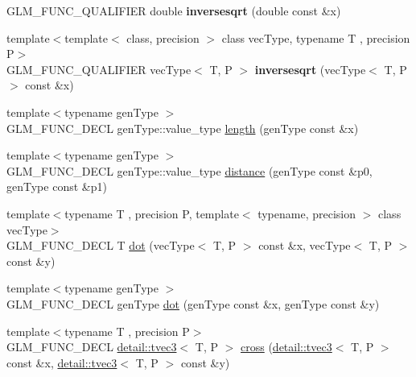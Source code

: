 \begin{DoxyCompactItemize}
\item 
G\+L\+M\+\_\+\+F\+U\+N\+C\+\_\+\+Q\+U\+A\+L\+I\+F\+I\+ER double {\bfseries inversesqrt} (double const \&x)\hypertarget{namespaceglm_a83786622d7ff4afca48a9c730b4cabf4}{}\label{namespaceglm_a83786622d7ff4afca48a9c730b4cabf4}

\item 
{\footnotesize template$<$template$<$ class, precision $>$ class vec\+Type, typename T , precision P$>$ }\\G\+L\+M\+\_\+\+F\+U\+N\+C\+\_\+\+Q\+U\+A\+L\+I\+F\+I\+ER vec\+Type$<$ T, P $>$ {\bfseries inversesqrt} (vec\+Type$<$ T, P $>$ const \&x)\hypertarget{namespaceglm_a3f7480375deccaf2afd47faa620d5fd8}{}\label{namespaceglm_a3f7480375deccaf2afd47faa620d5fd8}

\item 
{\footnotesize template$<$typename gen\+Type $>$ }\\G\+L\+M\+\_\+\+F\+U\+N\+C\+\_\+\+D\+E\+CL gen\+Type\+::value\+\_\+type \hyperlink{group__core__func__geometric_ga03b2831439defb8922832b540b91b8a7}{length} (gen\+Type const \&x)
\item 
{\footnotesize template$<$typename gen\+Type $>$ }\\G\+L\+M\+\_\+\+F\+U\+N\+C\+\_\+\+D\+E\+CL gen\+Type\+::value\+\_\+type \hyperlink{group__core__func__geometric_ga00716eae37e8ae2a76ca7799f9c75682}{distance} (gen\+Type const \&p0, gen\+Type const \&p1)
\item 
{\footnotesize template$<$typename T , precision P, template$<$ typename, precision $>$ class vec\+Type$>$ }\\G\+L\+M\+\_\+\+F\+U\+N\+C\+\_\+\+D\+E\+CL T \hyperlink{group__core__func__geometric_ga7dada304da2ba7dd3376ab4f178c3f6b}{dot} (vec\+Type$<$ T, P $>$ const \&x, vec\+Type$<$ T, P $>$ const \&y)
\item 
{\footnotesize template$<$typename gen\+Type $>$ }\\G\+L\+M\+\_\+\+F\+U\+N\+C\+\_\+\+D\+E\+CL gen\+Type \hyperlink{group__core__func__geometric_gaef767c2b0678489cb9de7a534137a86d}{dot} (gen\+Type const \&x, gen\+Type const \&y)
\item 
{\footnotesize template$<$typename T , precision P$>$ }\\G\+L\+M\+\_\+\+F\+U\+N\+C\+\_\+\+D\+E\+CL \hyperlink{structglm_1_1detail_1_1tvec3}{detail\+::tvec3}$<$ T, P $>$ \hyperlink{group__core__func__geometric_ga89b91c2a256cfb62ecbc589d1ee36d3c}{cross} (\hyperlink{structglm_1_1detail_1_1tvec3}{detail\+::tvec3}$<$ T, P $>$ const \&x, \hyperlink{structglm_1_1detail_1_1tvec3}{detail\+::tvec3}$<$ T, P $>$ const \&y)

\end{DoxyCompactItemize}
